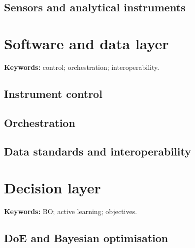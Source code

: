 \subsection{Sensors and analytical instruments}


\section{Software and data layer}

\begin{methodbox}
\textbf{Keywords:} control; orchestration; interoperability.
\end{methodbox}

\subsection{Instrument control}


\subsection{Orchestration}


\subsection{Data standards and interoperability}


\section{Decision layer}

\begin{conceptbox}
\textbf{Keywords:} BO; active learning; objectives.
\end{conceptbox}

\subsection{DoE and Bayesian optimisation}


